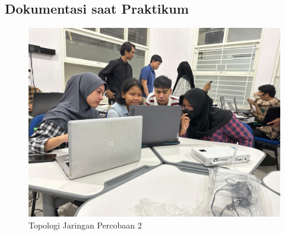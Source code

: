 \subsection{Dokumentasi saat Praktikum}
\begin{figure}[H]
	\centering
	\includegraphics[width=0.75\linewidth]{P2/img/dokum1.jpg}
	\caption{Topologi Jaringan Percobaan 2}
	\label{fig:gambar32}
\end{figure}
